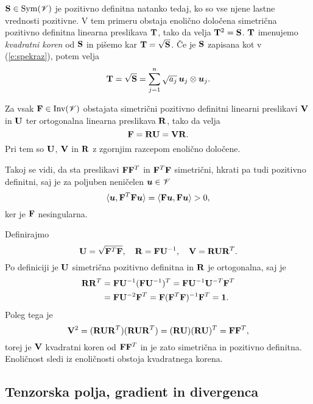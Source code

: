 $\mathbf S\in\mathrm{Sym}(\mathscr V)$ je pozitivno definitna natanko tedaj, ko so vse njene
lastne vrednosti pozitivne. V tem primeru obstaja enolično določena simetrična pozitivno
definitna linearna preslikava $\mathbf T$, tako da velja $\mathbf T^2=\mathbf S$.
$\mathbf T$ imenujemo \emph{kvadratni koren} od $\mathbf S$ in pišemo kar $\mathbf T=\sqrt{\mathbf S}$.
Če je $\mathbf S$ zapisana kot v (\ref{e:spekraz}), potem velja
\[
	\mathbf T=\sqrt{\mathbf S}=\sum_{j=1}^n \sqrt{a_j}\,\boldsymbol u_j\otimes\boldsymbol u_j.
\]

\begin{izrek} \label{i:polraz}
	Za vsak $\mathbf F\in\textrm{Inv}(\mathscr V)$
	obstajata simetrični pozitivno definitni linearni preslikavi $\mathbf V$ in $\mathbf U$
	ter ortogonalna linearna preslikava $\mathbf R$, tako da velja
	\[
		\mathbf F=\mathbf R\mathbf U=\mathbf V\mathbf R.
	\]
	Pri tem so $\mathbf U$, $\mathbf V$ in $\mathbf R$ z zgornjim razcepom enolično določene.
\end{izrek}

\proof
	Takoj se vidi, da sta preslikavi $\mathbf F\mathbf F^T$ in $\mathbf F^T\mathbf F$
	simetrični, hkrati pa tudi pozitivno definitni, saj je za poljuben neničelen $\boldsymbol u\in\mathscr V$
	\[ 
		\langle\boldsymbol u,\mathbf F^T\mathbf F\boldsymbol u\rangle=\langle\mathbf F\boldsymbol u,\mathbf F\boldsymbol u\rangle>0,
	\]
	ker je $\mathbf F$ nesingularna.
	
	Definirajmo
	\begin{equation} \label{e:uandv}
		\mathbf U=\sqrt{\mathbf F^T\mathbf F},\quad\mathbf R=\mathbf F\mathbf U^{-1},\quad
		\mathbf V=\mathbf R\mathbf U\mathbf R^T.
	\end{equation}
	Po definiciji je $\mathbf U$ simetrična pozitivno definitna in $\mathbf R$ je ortogonalna, saj je
	\begin{align*}
		\mathbf R\mathbf R^T&=\mathbf F\mathbf U^{-1}(\mathbf F\mathbf U^{-1})^T
		=\mathbf F\mathbf U^{-1}\mathbf U^{-T}\mathbf F^T \\ &=\mathbf F\mathbf U^{-2}\mathbf F^T
		=\mathbf F(\mathbf F^T\mathbf F)^{-1}\mathbf F^T=\mathbf 1.
	\end{align*}
	Poleg tega je
	\[
		\mathbf V^2=(\mathbf R\mathbf U\mathbf R^T)(\mathbf R\mathbf U\mathbf R^T)
		=(\mathbf R\mathbf U)(\mathbf R\mathbf U)^T=\mathbf F\mathbf F^T,
	\]
	torej je $\mathbf V$ kvadratni koren od $\mathbf F\mathbf F^T$ in je zato
	simetrična in pozitivno definitna. Enoličnost sledi iz enoličnosti obstoja
	kvadratnega korena.
\endproof


\subsection{Tenzorska polja, gradient in divergenca}


